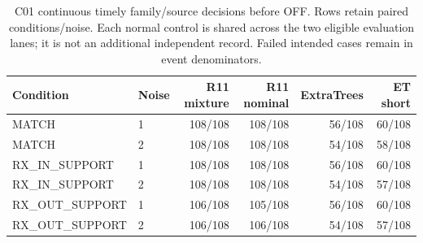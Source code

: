 \begin{table}[t]\centering\small
\caption{C01 continuous timely family/source decisions before OFF. Rows retain paired conditions/noise. Each normal control is shared across the two eligible evaluation lanes; it is not an additional independent record. Failed intended cases remain in event denominators.}
\label{tab:c01-continuous}
\begin{tabular}{llrrrr}
\toprule
Condition & Noise & R11 mixture & R11 nominal & ExtraTrees & ET short\\\midrule
MATCH & 1 & 108/108 & 108/108 & 56/108 & 60/108\\
MATCH & 2 & 108/108 & 108/108 & 54/108 & 58/108\\
RX\_IN\_SUPPORT & 1 & 108/108 & 108/108 & 56/108 & 60/108\\
RX\_IN\_SUPPORT & 2 & 108/108 & 108/108 & 54/108 & 57/108\\
RX\_OUT\_SUPPORT & 1 & 106/108 & 105/108 & 56/108 & 60/108\\
RX\_OUT\_SUPPORT & 2 & 106/108 & 106/108 & 54/108 & 57/108\\
\bottomrule\end{tabular}\end{table}
